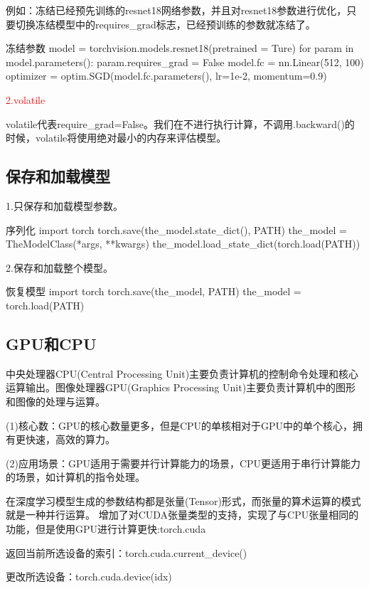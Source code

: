 \documentclass[openbib]{article}
\begin{document}
例如：冻结已经预先训练的resnet18网络参数，并且对resnet18参数进行优化，只要切换冻结模型中的requires\_grad标志，已经预训练的参数就冻结了。
\begin{Python}{冻结参数}
	model = torchvision.models.resnet18(pretrained = Ture)
	for param in model.parameters():
	param.requires_grad = False
	model.fc = nn.Linear(512, 100)
	optimizer = optim.SGD(model.fc.parameters(), lr=1e-2, momentum=0.9)
\end{Python}
\begin{center}
	\textcolor{red}{2.volatile}
\end{center}

volatile代表require\_grad=False。我们在不进行执行计算，不调用.backward()的时候，volatile将使用绝对最小的内存来评估模型。

\subsection{保存和加载模型}
1.只保存和加载模型参数。
\begin{Python}{序列化}
	import torch
	torch.save(the_model.state_dict(), PATH)
	the_model = TheModelClass(*args, **kwargs)
	the_model.load_state_dict(torch.load(PATH))
\end{Python}
2.保存和加载整个模型。
\begin{Python}{恢复模型}
	import torch
	torch.save(the_model, PATH)
	the_model = torch.load(PATH)
\end{Python}

\subsection{GPU和CPU}
中央处理器CPU(Central Processing Unit)主要负责计算机的控制命令处理和核心运算输出。图像处理器GPU(Graphics Processing Unit)主要负责计算机中的图形和图像的处理与运算。

(1)核心数：GPU的核心数量更多，但是CPU的单核相对于GPU中的单个核心，拥有更快速，高效的算力。

(2)应用场景：GPU适用于需要并行计算能力的场景，CPU更适用于串行计算能力的场景，如计算机的指令处理。

在深度学习模型生成的参数结构都是张量(Tensor)形式，而张量的算术运算的模式就是一种并行运算。
增加了对CUDA张量类型的支持，实现了与CPU张量相同的功能，但是使用GPU进行计算更快:torch.cuda

返回当前所选设备的索引：torch.cuda.current\_device()

更改所选设备：torch.cuda.device(idx)
\end{document}

